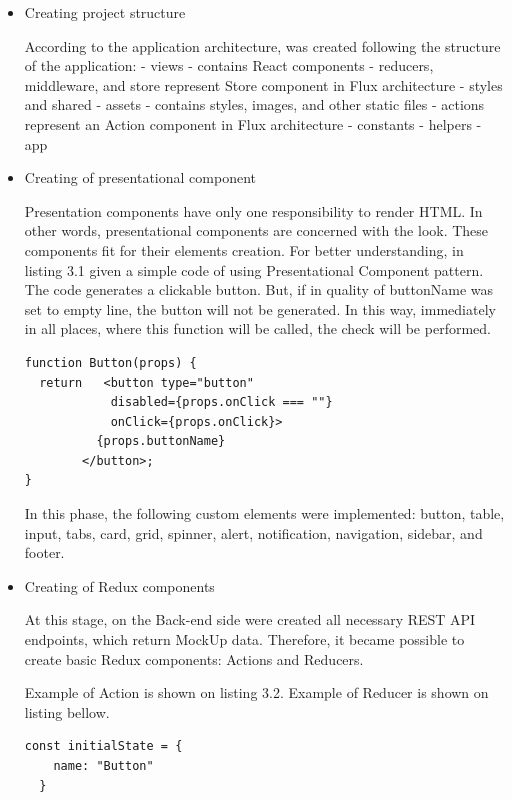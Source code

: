 \documentclass[thesis=B,english]{FITthesis}[2019/03/06]
\begin{document}
\begin{itemize}
  \item Creating project structure

According to the application architecture,  was created following the structure of the application:
    - views - contains React components
    - reducers, middleware, and store represent Store component in Flux architecture
    - styles and shared  
    - assets - contains styles, images, and other static files
    - actions represent an Action component in Flux architecture
    - constants 
    - helpers 
    - app   
  
  \item Creating of presentational component 
  
  Presentation components have only one responsibility to render HTML. In other words, presentational components are concerned with the look. These components fit for their elements creation. For better understanding, in listing 3.1 given a simple code of using Presentational Component pattern. The code generates a clickable button. But, if in quality of buttonName was set to empty line, the button will not be generated. In this way, immediately in all places, where this function will be called, the check will be performed.  

\begin{lstlisting}[float, caption=Source code of the Button function, label=code:button]
function Button(props) {
  return   <button type="button"  
            disabled={props.onClick === ""}
            onClick={props.onClick}>
          {props.buttonName}
        </button>;
}
\end{lstlisting}

In this phase, the following custom elements were implemented:
button, table, input, tabs, card, grid, spinner, alert, notification, navigation, sidebar, and footer. 
   
  \item Creating of Redux components

    At this stage, on the Back-end side were created all necessary REST API endpoints, which return MockUp data. Therefore, it became possible to create basic Redux components: Actions and Reducers.
    
    Example of Action is shown on listing 3.2. Example of Reducer is shown on listing bellow.
    
    
  
\begin{lstlisting}[float, caption=Source code of the nameReducer function, label=code:nameReducer]
  const initialState = {
    name: "Button"
  }


\end{lstlisting}
\end{itemize}
\end{document}
